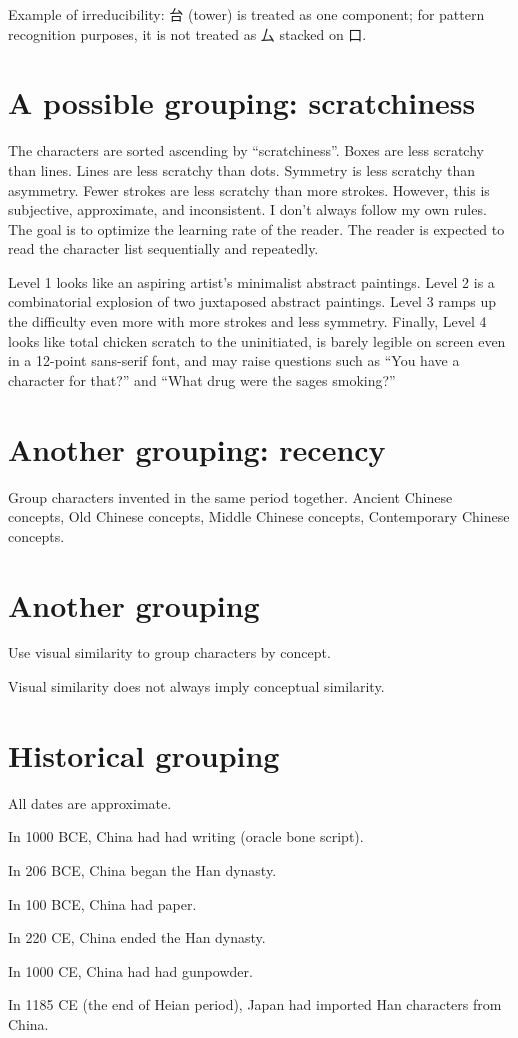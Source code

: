 Example of irreducibility:
台 (tower) is treated as one component;
for pattern recognition purposes,
it is not treated as 厶 stacked on 口.

\section{A possible grouping: scratchiness}

The characters are sorted ascending by ``scratchiness''.
Boxes are less scratchy than lines.
Lines are less scratchy than dots.
Symmetry is less scratchy than asymmetry.
Fewer strokes are less scratchy than more strokes.
However, this is subjective, approximate, and inconsistent.
I don't always follow my own rules.
The goal is to optimize the learning rate of the reader.
The reader is expected to read the character list
sequentially and repeatedly.

Level 1 looks like
an aspiring artist's minimalist abstract paintings.
Level 2 is a combinatorial explosion
of two juxtaposed abstract paintings.
Level 3 ramps up the difficulty even more with more strokes and less symmetry.
Finally, Level 4 looks like total chicken scratch to the uninitiated,
is barely legible on screen even in a 12-point sans-serif font,
and may raise questions such as
``You have a character for that?''
and
``What drug were the sages smoking?''

\section{Another grouping: recency}

Group characters invented in the same period together.
Ancient Chinese concepts,
Old Chinese concepts,
Middle Chinese concepts,
Contemporary Chinese concepts.

\section{Another grouping}

Use visual similarity to group characters by concept.

Visual similarity does not always imply conceptual similarity.

\section{Historical grouping}

All dates are approximate.

In 1000 BCE, China had had writing (oracle bone script).

In 206 BCE, China began the Han dynasty.

In 100 BCE, China had paper.

In 220 CE, China ended the Han dynasty.

In 1000 CE, China had had gunpowder.

In 1185 CE (the end of Heian period),
Japan had imported Han characters from China.
